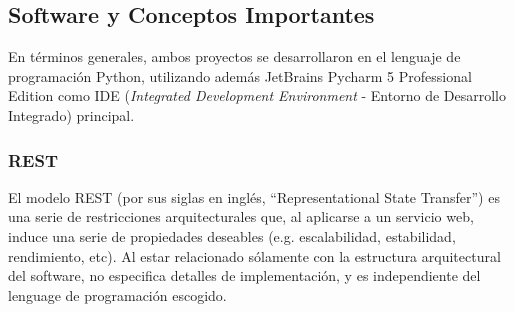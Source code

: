\documentclass[11pt,letterpaper]{article}
\begin{document}
\subsection{Software y Conceptos Importantes}
En términos generales, ambos proyectos se desarrollaron en el lenguaje de programación Python\cite{python}, utilizando además JetBrains Pycharm 5 Professional Edition\cite{pycharm} como IDE (\emph{Integrated Development Environment} - Entorno de Desarrollo Integrado) principal.

\subsubsection{REST}

El modelo REST (por sus siglas en inglés, ``Representational State Transfer'') es una serie de restricciones arquitecturales que, al aplicarse a un servicio web, induce una serie de propiedades deseables (e.g. escalabilidad, estabilidad, rendimiento, etc). Al estar relacionado sólamente con la estructura arquitectural del software, no especifica detalles de implementación, y es independiente del lenguage de programación escogido.\\
\end{document}
